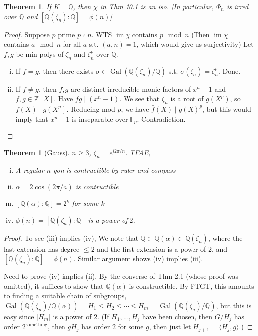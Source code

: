 \documentclass{article}
\theoremstyle{definition}
\theoremstyle{remark}
\theoremstyle{plain}
\newtheorem{thm}[defn]{Theorem}
\newcommand{\ZZ}{\mathbb{Z}}
\newcommand{\QQ}{\mathbb{Q}}
\newcommand{\FF}{\mathbb{F}}
\newcommand{\Gal}{\operatorname{Gal}}
\begin{document}
\begin{thm}
    If $K=\QQ$, then $\chi$ in Thm 10.1 is an iso. [In particular, $\Phi_n$ is irred over $\QQ$ and $[\QQ(\zeta_n):\QQ]=\phi(n)$]
\end{thm}
\begin{proof}
    Suppose $p$ prime $p\nmid n$. WTS $\operatorname{im}\chi$ contains $p\mod n$ (Then $\operatorname{im}\chi$ contains $a\mod n$ for all $a$ s.t. $(a,n)=1$, which would give us surjectivity)
    Let $f,g$ be min polys of $\zeta_n$ and $\zeta_n^p$ over $\QQ$.
    \begin{enumerate}[(i)]
        \item If $f=g$, then there exists $\sigma\in\Gal(\QQ(\zeta_n)/\QQ)$ s.t. $\sigma(\zeta_n)=\zeta_n^p$. Done.
        \item If $f\neq g$, then $f,g$ are distinct irreducible monic factors of $x^n-1$ and $f,g\in\ZZ[X]$. Have $fg\mid (x^n-1)$. We see that $\zeta_n$ is a root of $g(X^p)$, so $f(X)\mid g(X^p)$. Reducing mod $p$, we have $\bar f(X)\mid \bar g(X)^p$, but this would imply that $x^n-1$ is inseparable over $\FF_p$. Contradiction.
    \end{enumerate}
\end{proof}
\begin{thm}[Gauss]
    $n\ge 3$, $\zeta_n=e^{i2\pi /n}$. TFAE,
    \begin{enumerate}[(i)]
        \item A regular $n$-gon is contructible by ruler and compass
        \item $\alpha=2\cos(2\pi/n)$ is contructible
        \item $[\QQ(\alpha):\QQ]=2^k$ for some $k$
        \item $\phi(n)=[\QQ(\zeta_n):\QQ]$ is a power of $2$.
    \end{enumerate}
\end{thm}
\begin{proof}
    To see (iii) implies (iv), We note that $\QQ\subset\QQ(\alpha)\subset\QQ(\zeta_n)$, where the last extension has degree $\le 2$ and the first extension is a power of $2$, and $[\QQ(\zeta_n):\QQ]=\phi(n)$.
    Similar argument shows (iv) implies (iii).

    Need to prove (iv) implies (ii). By the converse of Thm 2.1 (whose proof was omitted), it suffices to show that $\QQ(\alpha)$ is constructible. By FTGT, this amounts to finding a suitable chain of subgroups, $\Gal(\QQ(\zeta_n)/\QQ(\alpha))=H_1\le H_2\le \cdots\le H_m=\Gal(\QQ(\zeta_n)/\QQ)$, but this is easy since $|H_m|$ is a power of $2$. (If $H_1,...,H_j$ have been chosen, then $G/H_j$ has order $2^\text{something}$, then $gH_j$ has order $2$ for some $g$, then just let $H_{j+1}=\langle H_j,g\rangle$.)
\end{proof}
\end{document}
